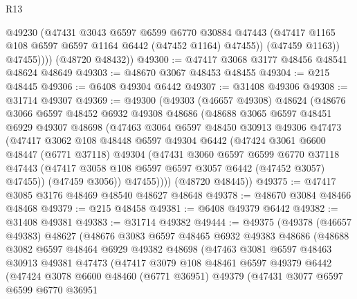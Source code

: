 \begin{lexlean}{R13}
\begin{coremodule}
                @49230
                (@47431
                  @3043
                  @6597
                  @6599
                  @6770
                  @30884
                  @47443
                  (@47417 @1165 @108 @6597 @6597 @1164 @6442 (@47452 @1164) @47455))
                (@47459 @1163))
              @47455))))
      (@48720 @48432))
@49300 := @47417 @3068 @3177 @48456 @48541 @48624 @48649
@49303 := @48670 @3067 @48453 @48455
@49304 := @215 @48445
@49306 := @6408 @49304 @6442
@49307 := @31408 @49306
@49308 := @31714 @49307
@49369 := @49300
    (@49303
      (@46657 @49308)
      @48624
      (@48676
        @3066
        @6597
        @48452
        @6932
        @49308
        @48686
        (@48688
          @3065
          @6597
          @48451
          @6929
          @49307
          @48698
          (@47463
            @3064
            @6597
            @48450
            @30913
            @49306
            @47473
            (@47417
              @3062
              @108
              @48448
              @6597
              @49304
              @6442
              (@47424
                @3061
                @6600
                @48447
                (@6771 @37118)
                @49304
                (@47431
                  @3060
                  @6597
                  @6599
                  @6770
                  @37118
                  @47443
                  (@47417 @3058 @108 @6597 @6597 @3057 @6442 (@47452 @3057) @47455))
                (@47459 @3056))
              @47455))))
      (@48720 @48445))
@49375 := @47417 @3085 @3176 @48469 @48540 @48627 @48648
@49378 := @48670 @3084 @48466 @48468
@49379 := @215 @48458
@49381 := @6408 @49379 @6442
@49382 := @31408 @49381
@49383 := @31714 @49382
@49444 := @49375
    (@49378
      (@46657 @49383)
      @48627
      (@48676
        @3083
        @6597
        @48465
        @6932
        @49383
        @48686
        (@48688
          @3082
          @6597
          @48464
          @6929
          @49382
          @48698
          (@47463
            @3081
            @6597
            @48463
            @30913
            @49381
            @47473
            (@47417
              @3079
              @108
              @48461
              @6597
              @49379
              @6442
              (@47424
                @3078
                @6600
                @48460
                (@6771 @36951)
                @49379
                (@47431
                  @3077
                  @6597
                  @6599
                  @6770
                  @36951

\end{coremodule}
\end{lexlean}
